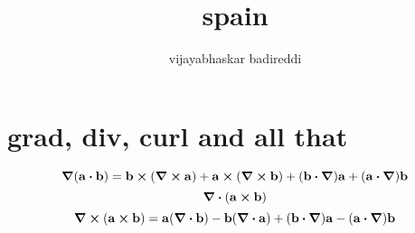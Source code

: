 \documentclass[12pt]{article}
\title{spain}
\author{vijayabhaskar badireddi}
\begin{document}
    
\section*{grad, div, curl and all that}

\[\grad{\qty(\vb{a}\vdot\vb{b})}=\vb{b}\cp\qty(\curl{\vb{a}})+\vb{a}\cp\qty(\curl{\vb{b}})+\qty(\vb{b}\vdot\grad)\vb{a}+\qty(\vb{a}\vdot\grad)\vb{b}\]    
\[\div{\qty(\vb{a}\cp\vb{b})}\]
\[\curl{\qty(\vb{a}\cp\vb{b})}=\vb{a}\qty(\div{\vb{b}})-\vb{b}\qty(\div{\vb{a}})+\qty(\vb{b}\vdot\grad)\vb{a}-\qty(\vb{a}\vdot\grad)\vb{b}\]

    
\end{document}
